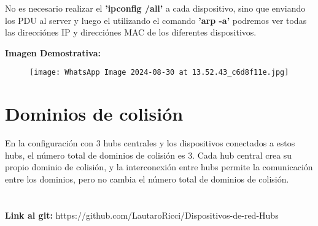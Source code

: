 \documentclass{article}
\begin{document}
	No es necesario realizar el \textbf{'ipconfig /all'} a cada dispositivo, sino que enviando los PDU al server y luego el utilizando el comando \textbf{'arp -a'} podremos ver todas las direcciónes IP y direcciónes MAC de los diferentes dispositivos.

 \textbf{Imagen Demostrativa:}
	\begin{figure}
	    \centering
	    \texttt{[image: WhatsApp Image 2024-08-30 at 13.52.43\_c6d8f11e.jpg]}
	\end{figure}
	
	\section{Dominios de colisión}
	
		En la configuración con 3 hubs centrales y los dispositivos conectados a estos hubs, el número total de dominios de colisión es 3. Cada hub central crea su propio dominio de colisión, y la interconexión entre hubs permite la comunicación entre los dominios, pero no cambia el número total de dominios de colisión.
\\
\\
\\
  \textbf{Link al git:} https://github.com/LautaroRicci/Dispositivos-de-red-Hubs
			
\end{document}
